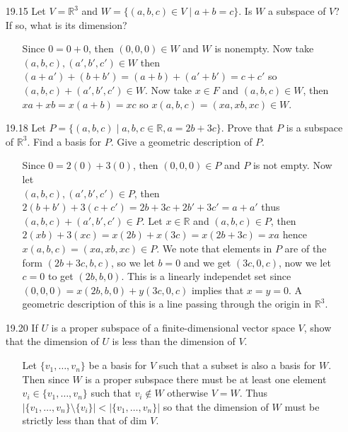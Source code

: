 \documentclass[12pt]{article}
\begin{document}
\begin{enumerate}
\item[19.15] Let $V = \mathbb{R}^3$ and $W = \{(a,b,c) \in V \mid a+b=c\}$. Is $W$ a subspace of $V$? If so, what is its dimension?
\begin{enumerate}
\item[] Since $0 = 0 + 0$, then $(0,0,0) \in W$ and $W$ is nonempty. Now take \\
$(a,b,c), (a',b',c') \in W$ then $(a+a')+(b+b') = (a+b)+(a'+b') = c + c'$ so $(a,b,c)+(a',b',c') \in W$. Now take $x \in F$ and $(a,b,c) \in W$, then $xa + xb = x(a+b) = xc$ so $x(a,b,c) = (xa, xb, xc) \in W$.
\end{enumerate}

\item[19.18] Let $P = \{ (a,b,c) \mid a, b, c \in \mathbb{R}, a = 2b + 3c \}$. Prove that $P$ is a subspace of $\mathbb{R}^3$. Find a basis for $P$. Give a geometric description of $P$.
\begin{enumerate}
\item[] Since $0 = 2(0) + 3(0)$, then $(0,0,0) \in P$ and $P$ is not empty. Now let \\
$(a,b,c), (a',b',c') \in P$, then $2(b + b') + 3(c + c') = 2b + 3c + 2b' + 3c' = a + a'$ thus $(a,b,c)+(a',b',c') \in P$. Let $x \in \mathbb{R}$ and $(a,b,c) \in P$, then $2(xb) + 3(xc) = x(2b) + x(3c) = x(2b + 3c) = xa$ hence $x(a,b,c) = (xa, xb, xc) \in P$. We note that elements in $P$ are of the form $(2b + 3c, b, c)$, so we let $b = 0$ and we get $(3c, 0, c)$, now we let $c = 0$ to get $(2b, b, 0)$. This is a linearly independet set since $(0, 0, 0) = x(2b, b, 0) + y(3c, 0, c)$ implies that $x = y = 0$. A geometric description of this is a line passing through the origin in $\mathbb{R}^3$.
\end{enumerate}

\item[19.20] If $U$ is a proper subspace of a finite-dimensional vector space $V$, show that the dimension of $U$ is less than the dimension of $V$.
\begin{enumerate}
\item[] Let $\{v_1, \ldots, v_n \}$ be a basis for $V$ such that a subset is also a basis for $W$. Then since $W$ is a proper subspace there must be at least one element $v_i \in \{v_1, \ldots, v_n \}$ such that $v_i \not\in W$ otherwise $V = W$. Thus $|\{v_1, \ldots, v_n \}\setminus \{v_i\}| < |\{v_1, \ldots, v_n \}|$ so that the dimension of $W$ must be strictly less than that of dim $V$.
\end{enumerate}


\end{enumerate}
\end{document}
